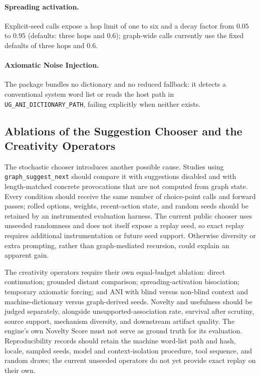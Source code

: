 \paragraph{Spreading activation.} Explicit-seed calls expose a hop limit of one to six and a decay factor from $0.05$ to $0.95$ (defaults: three hops and $0.6$); graph-wide calls currently use the fixed defaults of three hops and $0.6$.

\paragraph{Axiomatic Noise Injection.} The package bundles no dictionary and no reduced fallback: it detects a conventional system word list or reads the host path in \texttt{UG\_ANI\_DICTIONARY\_PATH}, failing explicitly when neither exists.

\subsection{Ablations of the Suggestion Chooser and the Creativity Operators}

The stochastic chooser introduces another possible cause. Studies using \texttt{graph\_suggest\_next} should compare it with suggestions disabled and with length-matched concrete provocations that are not computed from graph state. Every condition should receive the same number of choice-point calls and forward passes; rolled options, weights, recent-action state, and random seeds should be retained by an instrumented evaluation harness. The current public chooser uses unseeded randomness and does not itself expose a replay seed, so exact replay requires additional instrumentation or future seed support. Otherwise diversity or extra prompting, rather than graph-mediated recursion, could explain an apparent gain.

The creativity operators require their own equal-budget ablation: direct continuation; grounded distant comparison; spreading-activation bisociation; temporary axiomatic forcing; and ANI with blind versus non-blind context and machine-dictionary versus graph-derived seeds. Novelty and usefulness should be judged separately, alongside unsupported-association rate, survival after scrutiny, source support, mechanism diversity, and downstream artifact quality. The engine's own Novelty Score must not serve as ground truth for its evaluation. Reproducibility records should retain the machine word-list path and hash, locale, sampled seeds, model and context-isolation procedure, tool sequence, and random draws; the current unseeded operators do not yet provide exact replay on their own.



